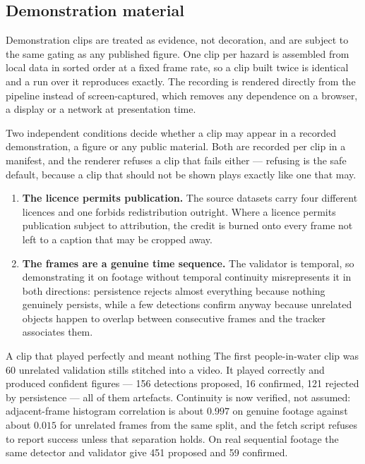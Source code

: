 \subsection{Demonstration material}
\label{sec:demo}

Demonstration clips are treated as evidence, not decoration, and are
subject to the same gating as any published figure. One clip per hazard is
assembled from local data in sorted order at a fixed frame rate, so a clip
built twice is identical and a run over it reproduces exactly. The recording
is rendered directly from the pipeline instead of screen-captured, which
removes any dependence on a browser, a display or a network at presentation
time.

Two independent conditions decide whether a clip may appear in a recorded
demonstration, a figure or any public material. Both are recorded per clip in
a manifest, and the renderer refuses a clip that fails either — refusing is
the safe default, because a clip that should not be shown plays exactly like
one that may.

\begin{enumerate}
  \item \textbf{The licence permits publication.} The source datasets carry
        four different licences and one forbids redistribution outright. Where
        a licence permits publication subject to attribution, the credit is
        burned onto every frame not left to a caption that may be
        cropped away.
  \item \textbf{The frames are a genuine time sequence.} The validator is
        temporal, so demonstrating it on footage without temporal continuity
        misrepresents it in both directions: persistence rejects almost
        everything because nothing genuinely persists, while a few detections
        confirm anyway because unrelated objects happen to overlap between
        consecutive frames and the tracker associates them.
\end{enumerate}

\begin{recorded}{A clip that played perfectly and meant nothing}
The first people-in-water clip was 60 unrelated validation stills stitched
into a video. It played correctly and produced confident figures — 156
detections proposed, 16 confirmed, 121 rejected by persistence — all of them
artefacts. Continuity is now verified, not assumed: adjacent-frame
histogram correlation is about $0.997$ on genuine footage against about
$0.015$ for unrelated frames from the same split, and the fetch script refuses
to report success unless that separation holds. On real sequential footage the
same detector and validator give 451 proposed and 59 confirmed.
\end{recorded}

